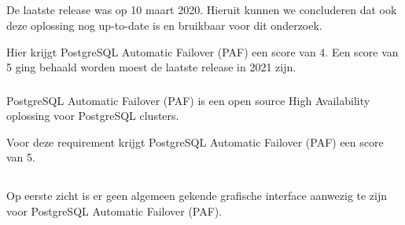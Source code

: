 \subsection{}
\label{subsec:Should have}



\subsubsection{}
\label{subsubsec:Actieve ondersteuning in 2020-2021}

De laatste release was op 10 maart 2020. Hieruit kunnen we concluderen dat ook deze oplossing nog up-to-date is en bruikbaar voor dit onderzoek. 

Hier krijgt PostgreSQL Automatic Failover (PAF) een score van 4. Een score van 5 ging behaald worden moest de laatste release in 2021 zijn.

\subsubsection{}
\label{subsubsec:Open source}

PostgreSQL Automatic Failover (PAF) is een open source High Availability oplossing voor PostgreSQL clusters.

Voor deze requirement krijgt PostgreSQL Automatic Failover (PAF) een score van 5.

\subsection{}
\label{subsec:Could have}

\subsubsection{}
\label{subsubsec:Grafische interface}

Op eerste zicht is er geen algemeen gekende grafische interface aanwezig te zijn voor PostgreSQL Automatic Failover (PAF).

\subsubsection{}
\label{subsubsec:Beperkte manuele interventie}

